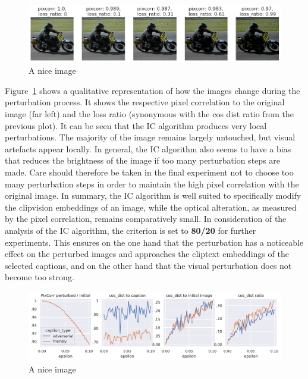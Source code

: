 
\begin{figure}[ht]
    \centering
    \includegraphics[width=1\textwidth]{plots/advpert_ic_qual_validation_evolution.png}
    \caption{A nice image}\label{fig:advpert_ic_qual_validation_evolution}
\end{figure}

Figure~\ref{fig:advpert_ic_qual_validation_evolution} shows a qualitative representation of how the images change during the perturbation process. It shows the respective pixel correlation to the original image (far left) and the loss ratio (synonymous with the cos dist ratio from the previous plot). It can be seen that the IC algorithm produces very local perturbations. The majority of the image remains largely untouched, but visual artefacts appear locally. In general, the IC algorithm also seems to have a bias that reduces the brightness of the image if too many perturbation steps are made. Care should therefore be taken in the final experiment not to choose too many perturbation steps in order to maintain the high pixel correlation with the original image. In summary, the IC algorithm is well suited to specifically modify the clipvision embeddings of an image, while the optical alteration, as measured by the pixel correlation, remains comparatively small. In consideration of the analysis of the IC algorithm, the criterion is set to \textbf{80/20} for further experiments. This ensures on the one hand that the perturbation has a noticeable effect on the perturbed images and approaches the cliptext embeddings of the selected captions, and on the other hand that the visual perturbation does not become too strong. 


\begin{figure}[ht]
    \centering
    \includegraphics[width=1\textwidth]{plots/advpert_validation_fgsm_loss_curves.png}
    \caption{A nice image}\label{fig:advpert_validation_fgsm_loss_curves}
\end{figure}

